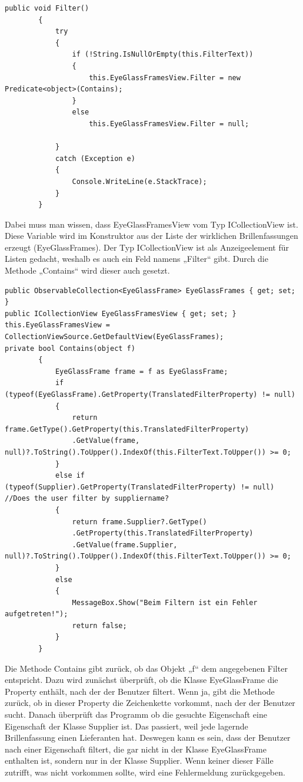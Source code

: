 \begin{lstlisting}
public void Filter()
        {
            try
            {
                if (!String.IsNullOrEmpty(this.FilterText))
                {
                    this.EyeGlassFramesView.Filter = new Predicate<object>(Contains);
                }
                else
                    this.EyeGlassFramesView.Filter = null;

            }
            catch (Exception e)
            {
                Console.WriteLine(e.StackTrace);
            }
        }
\end{lstlisting}
Dabei muss man wissen, dass EyeGlassFramesView vom Typ ICollectionView ist. Diese Variable wird im Konstruktor aus der Liste der wirklichen Brillenfassungen erzeugt (EyeGlassFrames). Der Typ ICollectionView ist als Anzeigeelement für Listen gedacht, weshalb es auch ein Feld namens „Filter“ gibt. Durch die Methode „Contains“ wird dieser auch gesetzt.
\begin{lstlisting}
public ObservableCollection<EyeGlassFrame> EyeGlassFrames { get; set; }
public ICollectionView EyeGlassFramesView { get; set; }
this.EyeGlassFramesView = CollectionViewSource.GetDefaultView(EyeGlassFrames);
private bool Contains(object f)
        {
            EyeGlassFrame frame = f as EyeGlassFrame;
            if (typeof(EyeGlassFrame).GetProperty(TranslatedFilterProperty) != null)
            {
                return frame.GetType().GetProperty(this.TranslatedFilterProperty)
                .GetValue(frame, null)?.ToString().ToUpper().IndexOf(this.FilterText.ToUpper()) >= 0;
            }
            else if (typeof(Supplier).GetProperty(TranslatedFilterProperty) != null) //Does the user filter by suppliername?
            {
                return frame.Supplier?.GetType()
                .GetProperty(this.TranslatedFilterProperty)
                .GetValue(frame.Supplier, null)?.ToString().ToUpper().IndexOf(this.FilterText.ToUpper()) >= 0;
            }
            else
            {
                MessageBox.Show("Beim Filtern ist ein Fehler aufgetreten!");
                return false;
            }
        }
\end{lstlisting}
Die Methode Contains gibt zurück, ob das Objekt „f“ dem angegebenen Filter entspricht. Dazu wird zunächst überprüft, ob die Klasse EyeGlassFrame die Property enthält, nach der der Benutzer filtert. Wenn ja, gibt die Methode zurück, ob in dieser Property die Zeichenkette vorkommt, nach der der Benutzer sucht. Danach überprüft das Programm ob die gesuchte Eigenschaft eine Eigenschaft der Klasse Supplier ist. Das passiert, weil jede lagernde Brillenfassung einen Lieferanten hat. Deswegen kann es sein, dass der Benutzer nach einer Eigenschaft filtert, die gar nicht in der Klasse EyeGlassFrame enthalten ist, sondern nur in der Klasse Supplier. Wenn keiner dieser Fälle zutrifft, was nicht vorkommen sollte, wird eine Fehlermeldung zurückgegeben.
